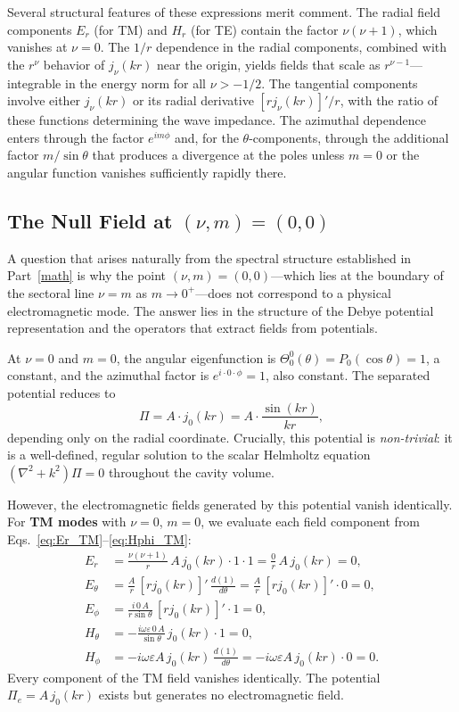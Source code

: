 \documentclass[
  aip,
  amsmath,amssymb,
  preprint
]{revtex4-1}
\begin{document}
Several structural features of these expressions merit comment. The radial field components $E_r$ (for TM) and $H_r$ (for TE) contain the factor $\nu(\nu+1)$, which vanishes at $\nu = 0$. The $1/r$ dependence in the radial components, combined with the $r^\nu$ behavior of $j_\nu(kr)$ near the origin, yields fields that scale as $r^{\nu-1}$---integrable in the energy norm for all $\nu > -1/2$. The tangential components involve either $j_\nu(kr)$ or its radial derivative $[rj_\nu(kr)]'/r$, with the ratio of these functions determining the wave impedance. The azimuthal dependence enters through the factor $e^{im\phi}$ and, for the $\theta$-components, through the additional factor $m/\sin\theta$ that produces a divergence at the poles unless $m = 0$ or the angular function vanishes sufficiently rapidly there.


\subsection{The Null Field at $(\nu, m) = (0, 0)$}
\label{sec:null}
A question that arises naturally from the spectral structure established in Part~\ref{math} is why the point $(\nu, m) = (0, 0)$---which lies at the boundary of the sectoral line $\nu = m$ as $m \to 0^+$---does not correspond to a physical electromagnetic mode. The answer lies in the structure of the Debye potential representation and the operators that extract fields from potentials.

At $\nu = 0$ and $m = 0$, the angular eigenfunction is $\Theta_0^0(\theta) = P_0(\cos\theta) = 1$, a constant, and the azimuthal factor is $e^{i \cdot 0 \cdot \phi} = 1$, also constant. The separated potential reduces to
\begin{equation}
\Pi = A \cdot j_0(kr) = A \cdot \frac{\sin(kr)}{kr},
\end{equation}
depending only on the radial coordinate. Crucially, this potential is \emph{non-trivial}: it is a well-defined, regular solution to the scalar Helmholtz equation $(\nabla^2 + k^2)\Pi = 0$ throughout the cavity volume.

However, the electromagnetic fields generated by this potential vanish identically. For \textbf{TM modes} with $\nu = 0$, $m = 0$, we evaluate each field component from Eqs.~\eqref{eq:Er_TM}--\eqref{eq:Hphi_TM}:
\begin{align}
E_r &= \frac{\nu(\nu+1)}{r}\,A\,j_0(kr)\cdot 1 \cdot 1 = \frac{0}{r}\,A\,j_0(kr) = 0, \\[4pt]
E_\theta &= \frac{A}{r}\,[r j_0(kr)]'\,\frac{d(1)}{d\theta} = \frac{A}{r}\,[r j_0(kr)]'\cdot 0 = 0, \\[4pt]
E_\phi &= \frac{i\,0\,A}{r\sin\theta}\,[r j_0(kr)]'\cdot 1 = 0, \\[4pt]
H_\theta &= -\frac{i\omega\varepsilon\,0\,A}{\sin\theta}\,j_0(kr)\cdot 1 = 0, \\[4pt]
H_\phi &= -i\omega\varepsilon A\, j_0(kr)\,\frac{d(1)}{d\theta} = -i\omega\varepsilon A\, j_0(kr)\cdot 0 = 0.
\end{align}
Every component of the TM field vanishes identically. The potential $\Pi_e = A\,j_0(kr)$ exists but generates no electromagnetic field.
\end{document}

